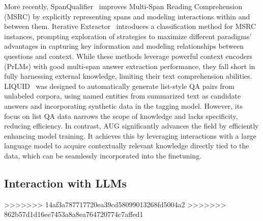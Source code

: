 More recently, SpanQualifier~\cite{huang2023qualifier} improves Multi-Span Reading Comprehension (MSRC) by explicitly representing spans and modeling interactions within and between them.
Iterative Extractor~\cite{zhang2023many} introduces a classification method for MSRC instances, prompting exploration of strategies to maximize different paradigms' advantages in capturing key information and modeling relationships between questions and context.
While these methods leverage powerful context encoders (PrLMs) with good multi-span answer extraction performance, they fall short in fully harnessing external knowledge, limiting their text comprehension abilities.
LIQUID~\cite{lee2023liquid} was designed to automatically generate list-style QA pairs from unlabeled corpora, using named entities from summarized text as candidate answers and incorporating synthetic data in the tagging model. However, its focus on list QA data narrows the scope of knowledge and lacks specificity, reducing efficiency.
In contrast, AUG significantly advances the field by efficiently enhancing model training. It achieves this by leveraging interactions with a large language model to acquire contextually relevant knowledge directly tied to the data, which can be seamlessly incorporated into the finetuning.


\subsection{Interaction with LLMs}
>>>>>>> 14af3a787717720ea39cd58099013268fd5004a2
>>>>>>> 862b57d1d16ee7453a8a8ea764720774c7affed1
